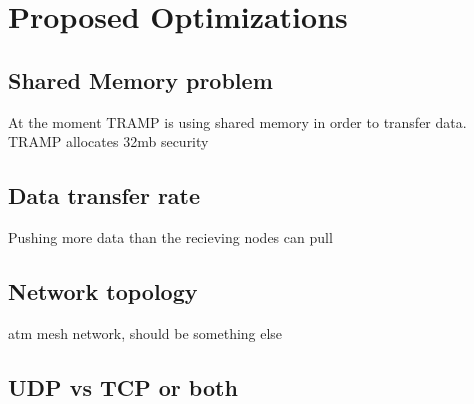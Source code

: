 \section{Proposed Optimizations}
\label{sec:optimizations}

\subsection{Shared Memory problem}
At the moment TRAMP is using shared memory in order to transfer data. TRAMP allocates 32mb
security

\subsection{Data transfer rate}
Pushing more data than the recieving nodes can pull

\subsection{Network topology}
atm mesh network, should be something else

\subsection{UDP vs TCP or both}







